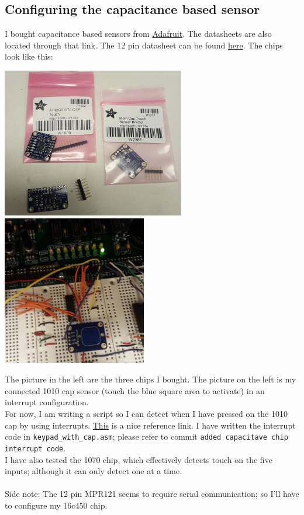 \documentclass[12pt,twoside]{article}
\begin{document}
\subsection{Configuring the capacitance based sensor}
I bought capacitance based sensors from \href{https://learn.adafruit.com/adafruit-capacitive-touch-sensor-breakouts/overview}{Adafruit}. The datasheets are also located through that link. The 12 pin datasheet can be found \href{https://www.sparkfun.com/products/9695}{here}. The chips look like this:
\begin{center}
\includegraphics[width = 80mm]{Pics/5-6a.jpg}
\includegraphics[width = 63mm]{Pics/5-6b.jpg}
\end{center}
The picture in the left are the three chips I bought. The picture on the left is my connected 1010 cap sensor (touch the blue square area to activate) in an interrupt configuration. 
\\ For now, I am writing a script so I can detect when I have pressed on the 1010 cap by using interrupts. \href{http://www.circuitstoday.com/external-interrupts-handling-in-8051}{This} is a nice reference link. I have written the interrupt code in \texttt{keypad\_with\_cap.asm}; please refer to commit \texttt{added capacitave chip interrupt code}. 
\\ I have also tested the 1070 chip, which effectively detects touch on the five inputs; although it can only detect one at a time. 
\\
\\ Side note: The 12 pin MPR121 seems to require serial communication; so I'll have to configure my 16c450 chip. 
\end{document}
